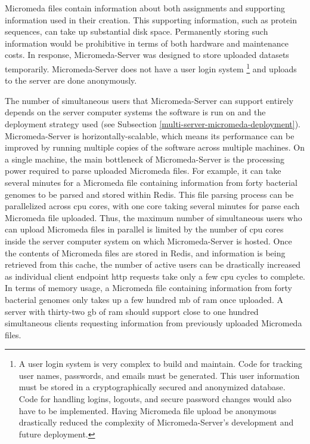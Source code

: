 Micromeda files contain information about both assignments and supporting 
information used in their creation. This supporting information, such as protein 
sequences, can take up substantial disk space. Permanently storing such 
information would be prohibitive in terms of both hardware and maintenance 
costs. In response, Micromeda-Server was designed to store uploaded datasets 
temporarily. Micromeda-Server does not have a user login system \footnote{A user 
login system is very complex to build and maintain. Code for tracking user 
names, passwords, and emails must be generated. This user information must be 
stored in a cryptographically secured and anonymized database. Code for handling 
logins, logouts, and secure password changes would also have to be implemented. 
Having Micromeda file upload be anonymous drastically reduced the complexity of 
Micromeda-Server's development and future deployment.} and uploads to the server 
are done anonymously.

The number of simultaneous users that Micromeda-Server can support entirely 
depends on the server computer systems the software is run on and the deployment 
strategy used (see Subsection \ref{multi-server-micromeda-deployment}). 
Micromeda-Server is horizontally-scalable, which means its performance can be 
improved by running multiple copies of the software across multiple machines. On 
a single machine, the main bottleneck of Micromeda-Server is the processing 
power required to parse uploaded Micromeda files. For example, it can take 
several minutes for a Micromeda file containing information from forty bacterial 
genomes to be parsed and stored within Redis. This file parsing process can be 
parallelized across \gls{cpu} cores, with one core taking several minutes for 
parse each Micromeda file uploaded. Thus, the maximum number of simultaneous 
users who can upload Micromeda files in parallel is limited by the number of 
\gls{cpu} cores inside the server computer system on which Micromeda-Server is 
hosted. Once the contents of Micromeda files are stored in Redis, and 
information is being retrieved from this cache, the number of active users can 
be drastically increased as individual client endpoint \gls{http} requests take 
only a few \gls{cpu} cycles to complete. In terms of memory usage, a Micromeda 
file containing information from forty bacterial genomes only takes up a few 
hundred \gls{mb} of \gls{ram} once uploaded. A server with thirty-two \gls{gb} 
of \gls{ram} should support close to one hundred simultaneous clients requesting 
information from previously uploaded Micromeda files.

